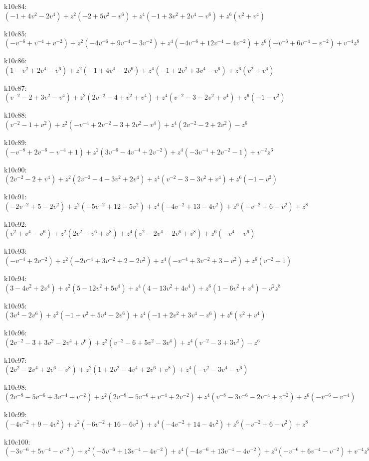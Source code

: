 k10c84: $ (-1+4v^{2}-2v^{4})  +z^{2}(-2+5v^{2}-v^{6})  +z^{4}(-1+3v^{2}+2v^{4}-v^{6})  +z^{6}(v^{2}+v^{4}) $ 

k10c85: $ (-v^{-6}+v^{-4}+v^{-2})  +z^{2}(-4v^{-6}+9v^{-4}-3v^{-2})  +z^{4}(-4v^{-6}+12v^{-4}-4v^{-2})  +z^{6}(-v^{-6}+6v^{-4}-v^{-2})  +v^{-4}z^{8} $ 

k10c86: $ (1-v^{2}+2v^{4}-v^{6})  +z^{2}(-1+4v^{4}-2v^{6})  +z^{4}(-1+2v^{2}+3v^{4}-v^{6})  +z^{6}(v^{2}+v^{4}) $ 

k10c87: $ (v^{-2}-2+3v^{2}-v^{4})  +z^{2}(2v^{-2}-4+v^{2}+v^{4})  +z^{4}(v^{-2}-3-2v^{2}+v^{4})  +z^{6}(-1-v^{2}) $ 

k10c88: $ (v^{-2}-1+v^{2})  +z^{2}(-v^{-4}+2v^{-2}-3+2v^{2}-v^{4})  +z^{4}(2v^{-2}-2+2v^{2})  -z^{6} $ 

k10c89: $ (-v^{-8}+2v^{-6}-v^{-4}+1)  +z^{2}(3v^{-6}-4v^{-4}+2v^{-2})  +z^{4}(-3v^{-4}+2v^{-2}-1)  +v^{-2}z^{6} $ 

k10c90: $ (2v^{-2}-2+v^{4})  +z^{2}(2v^{-2}-4-3v^{2}+2v^{4})  +z^{4}(v^{-2}-3-3v^{2}+v^{4})  +z^{6}(-1-v^{2}) $ 

k10c91: $ (-2v^{-2}+5-2v^{2})  +z^{2}(-5v^{-2}+12-5v^{2})  +z^{4}(-4v^{-2}+13-4v^{2})  +z^{6}(-v^{-2}+6-v^{2})  +z^{8} $ 

k10c92: $ (v^{2}+v^{4}-v^{6})  +z^{2}(2v^{2}-v^{6}+v^{8})  +z^{4}(v^{2}-2v^{4}-2v^{6}+v^{8})  +z^{6}(-v^{4}-v^{6}) $ 

k10c93: $ (-v^{-4}+2v^{-2})  +z^{2}(-2v^{-4}+3v^{-2}+2-2v^{2})  +z^{4}(-v^{-4}+3v^{-2}+3-v^{2})  +z^{6}(v^{-2}+1) $ 

k10c94: $ (3-4v^{2}+2v^{4})  +z^{2}(5-12v^{2}+5v^{4})  +z^{4}(4-13v^{2}+4v^{4})  +z^{6}(1-6v^{2}+v^{4})  -v^{2}z^{8} $ 

k10c95: $ (3v^{4}-2v^{6})  +z^{2}(-1+v^{2}+5v^{4}-2v^{6})  +z^{4}(-1+2v^{2}+3v^{4}-v^{6})  +z^{6}(v^{2}+v^{4}) $ 

k10c96: $ (2v^{-2}-3+3v^{2}-2v^{4}+v^{6})  +z^{2}(v^{-2}-6+5v^{2}-3v^{4})  +z^{4}(v^{-2}-3+3v^{2})  -z^{6} $ 

k10c97: $ (2v^{2}-2v^{4}+2v^{6}-v^{8})  +z^{2}(1+2v^{2}-4v^{4}+2v^{6}+v^{8})  +z^{4}(-v^{2}-3v^{4}-v^{6}) $ 

k10c98: $ (2v^{-8}-5v^{-6}+3v^{-4}+v^{-2})  +z^{2}(2v^{-8}-5v^{-6}+v^{-4}+2v^{-2})  +z^{4}(v^{-8}-3v^{-6}-2v^{-4}+v^{-2})  +z^{6}(-v^{-6}-v^{-4}) $ 

k10c99: $ (-4v^{-2}+9-4v^{2})  +z^{2}(-6v^{-2}+16-6v^{2})  +z^{4}(-4v^{-2}+14-4v^{2})  +z^{6}(-v^{-2}+6-v^{2})  +z^{8} $ 

k10c100: $ (-3v^{-6}+5v^{-4}-v^{-2})  +z^{2}(-5v^{-6}+13v^{-4}-4v^{-2})  +z^{4}(-4v^{-6}+13v^{-4}-4v^{-2})  +z^{6}(-v^{-6}+6v^{-4}-v^{-2})  +v^{-4}z^{8} $ 

